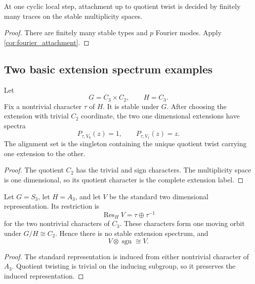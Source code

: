 \documentclass{aomart}
\theoremstyle{definition}
\theoremstyle{remark}
\newcommand{\Res}{\operatorname{Res}}
\begin{document}
\begin{corollary}\label{cor:finite_local_decision}
At one cyclic local step, attachment up to quotient twist is decided by finitely many traces on the stable multiplicity spaces.
\end{corollary}

\begin{proof}
There are finitely many stable types and \(p\) Fourier modes. Apply \cref{cor:fourier_attachment}.
\end{proof}

\subsection{Two basic extension spectrum examples}

\begin{example}\label{ex:stable_cyclic_type}
Let
\[
 G=C_3\times C_2,
 \qquad
 H=C_3.
\]
Fix a nontrivial character \(\tau\) of \(H\). It is stable under \(G\). After choosing the extension with trivial \(C_2\) coordinate, the two one dimensional extensions have spectra
\[
 P_{\tau,V_0}(z)=1,
 \qquad
 P_{\tau,V_1}(z)=z.
\]
The alignment set is the singleton containing the unique quotient twist carrying one extension to the other.
\end{example}

\begin{proof}
The quotient \(C_2\) has the trivial and sign characters. The multiplicity space is one dimensional, so its quotient character is the complete extension label.
\end{proof}

\begin{example}\label{ex:S3_moving_type}
Let \(G=S_3\), let \(H=A_3\), and let \(V\) be the standard two dimensional representation. Its restriction is
\[
 \Res_HV=\tau\oplus\tau^{-1}
\]
for the two nontrivial characters of \(C_3\). These characters form one moving orbit under \(G/H\cong C_2\). Hence there is no stable extension spectrum, and
\[
 V\otimes\operatorname{sgn}\cong V.
\]
\end{example}

\begin{proof}
The standard representation is induced from either nontrivial character of \(A_3\). Quotient twisting is trivial on the inducing subgroup, so it preserves the induced representation.
\end{proof}
\end{document}
